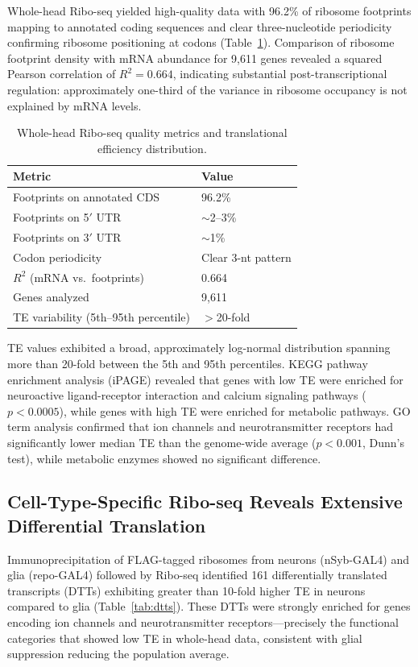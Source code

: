 \documentclass[12pt]{article}
\begin{document}
Whole-head Ribo-seq yielded high-quality data with 96.2\% of ribosome footprints mapping to annotated coding sequences and clear three-nucleotide periodicity confirming ribosome positioning at codons (Table~\ref{tab:riboseq}). Comparison of ribosome footprint density with mRNA abundance for 9,611 genes revealed a squared Pearson correlation of $R^{2} = 0.664$, indicating substantial post-transcriptional regulation: approximately one-third of the variance in ribosome occupancy is not explained by mRNA levels.

\begin{table}[ht]
\centering
\caption{Whole-head Ribo-seq quality metrics and translational efficiency distribution.}
\label{tab:riboseq}
\begin{tabular}{ll}
\toprule
Metric & Value \\
\midrule
Footprints on annotated CDS & 96.2\% \\
Footprints on 5$'$ UTR & $\sim$2--3\% \\
Footprints on 3$'$ UTR & $\sim$1\% \\
Codon periodicity & Clear 3-nt pattern \\
$R^{2}$ (mRNA vs.\ footprints) & 0.664 \\
Genes analyzed & 9,611 \\
TE variability (5th--95th percentile) & $>$20-fold \\
\bottomrule
\end{tabular}
\end{table}

TE values exhibited a broad, approximately log-normal distribution spanning more than 20-fold between the 5th and 95th percentiles. KEGG pathway enrichment analysis (iPAGE) revealed that genes with low TE were enriched for neuroactive ligand-receptor interaction and calcium signaling pathways ($p < 0.0005$), while genes with high TE were enriched for metabolic pathways. GO term analysis confirmed that ion channels and neurotransmitter receptors had significantly lower median TE than the genome-wide average ($p < 0.001$, Dunn's test), while metabolic enzymes showed no significant difference.

\subsection{Cell-Type-Specific Ribo-seq Reveals Extensive Differential Translation}

Immunoprecipitation of FLAG-tagged ribosomes from neurons (nSyb-GAL4) and glia (repo-GAL4) followed by Ribo-seq identified 161 differentially translated transcripts (DTTs) exhibiting greater than 10-fold higher TE in neurons compared to glia (Table~\ref{tab:dtts}). These DTTs were strongly enriched for genes encoding ion channels and neurotransmitter receptors---precisely the functional categories that showed low TE in whole-head data, consistent with glial suppression reducing the population average.
\end{document}
